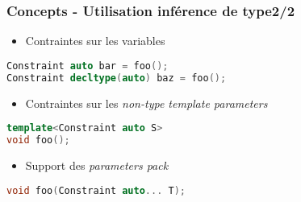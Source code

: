 \documentclass[C++.tex]{subfiles}
\begin{document}
\begin{frame}[fragile]
	\frametitle{Concepts - Utilisation inférence de type\titlehfill{}2/2}
	\begin{itemize}
		\item Contraintes sur les variables
	\end{itemize}

	\begin{lstlisting}[language=C++]
Constraint auto bar = foo();
Constraint decltype(auto) baz = foo();\end{lstlisting}

	\begin{itemize}
		\item Contraintes sur les \textit{non-type template parameters}
	\end{itemize}

	\begin{lstlisting}[language=C++]
template<Constraint auto S>
void foo();\end{lstlisting}

	\begin{itemize}
		\item Support des \textit{parameters pack}
	\end{itemize}
	
	\begin{lstlisting}[language=C++]
void foo(Constraint auto... T);\end{lstlisting}
\end{frame}
\end{document}
